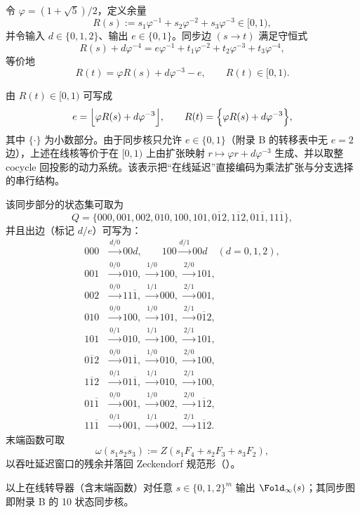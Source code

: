令 $\varphi=(1+\sqrt5)/2$，定义余量
\[
R(s):=s_1\varphi^{-1}+s_2\varphi^{-2}+s_3\varphi^{-3}\in[0,1),
\]
并令输入 $d\in\{0,1,2\}$、输出 $e\in\{0,1\}$。同步边 $(s\to t)$ 满足守恒式
\[
R(s)+d\varphi^{-4}=e\varphi^{-1}+t_1\varphi^{-2}+t_2\varphi^{-3}+t_3\varphi^{-4},
\]
等价地
\[
R(t)=\varphi R(s)+d\varphi^{-3}-e,\qquad R(t)\in[0,1).
\]
\begin{remark}
由 $R(t)\in[0,1)$ 可写成
\[
e=\Bigl\lfloor \varphi R(s)+d\varphi^{-3}\Bigr\rfloor,\qquad
R(t)=\Bigl\{\varphi R(s)+d\varphi^{-3}\Bigr\},
\]
其中 $\{\cdot\}$ 为小数部分。由于同步核只允许 $e\in\{0,1\}$（附录 B 的转移表中无 $e=2$ 边），上述在线核等价于在 $[0,1)$ 上由扩张映射 $r\mapsto \varphi r+d\varphi^{-3}$ 生成、并以取整 cocycle 回投影的动力系统。该表示把“在线延迟”直接编码为乘法扩张与分支选择的串行结构。
\end{remark}
该同步部分的状态集可取为
\[
Q=\{000,001,002,010,100,101,0\overline{1}2,1\overline{1}2,01\overline{1},11\overline{1}\},
\]
并且出边（标记 $d/e$）可写为：
\[
\begin{aligned}
000&\xrightarrow{d/0}00d,\qquad 100\xrightarrow{d/1}00d\quad(d=0,1,2),\\
001&\xrightarrow{0/0}010,\ \xrightarrow{1/0}100,\ \xrightarrow{2/0}101,\\
002&\xrightarrow{0/0}11\overline{1},\ \xrightarrow{1/1}000,\ \xrightarrow{2/1}001,\\
010&\xrightarrow{0/0}100,\ \xrightarrow{1/0}101,\ \xrightarrow{2/1}0\overline{1}2,\\
101&\xrightarrow{0/1}010,\ \xrightarrow{1/1}100,\ \xrightarrow{2/1}101,\\
0\overline{1}2&\xrightarrow{0/0}01\overline{1},\ \xrightarrow{1/0}010,\ \xrightarrow{2/0}100,\\
1\overline{1}2&\xrightarrow{0/1}01\overline{1},\ \xrightarrow{1/1}010,\ \xrightarrow{2/1}100,\\
01\overline{1}&\xrightarrow{0/0}001,\ \xrightarrow{1/0}002,\ \xrightarrow{2/0}1\overline{1}2,\\
11\overline{1}&\xrightarrow{0/1}001,\ \xrightarrow{1/1}002,\ \xrightarrow{2/1}1\overline{1}2.
\end{aligned}
\]
末端函数可取
\[
\omega(s_1s_2s_3):=Z(s_1F_4+s_2F_3+s_3F_2),
\]
以吞吐延迟窗口的残余并落回 Zeckendorf 规范形（\cite{Frougny1999OnlineAddition}）。

\begin{theorem}\label{thm:online-delay-fold}
以上在线转导器（含末端函数）对任意 $s\in\{0,1,2\}^m$ 输出 $\Fold_\infty(s)$；其同步图即附录 B 的 10 状态同步核。
\end{theorem}

